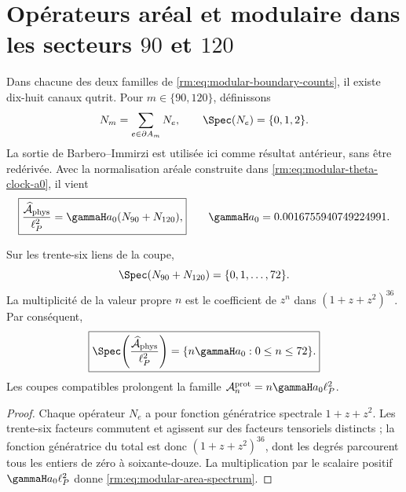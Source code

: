 \section{Opérateurs aréal et modulaire dans les secteurs \texorpdfstring{\(90\)}{90} et \texorpdfstring{\(120\)}{120}}

Dans chacune des deux familles de \cref{rm:eq:modular-boundary-counts}, il existe dix-huit canaux qutrit. Pour \(m\in\{90,120\}\), définissons
\begin{equation}
\label{rm:eq:modular-number-operators}
N_m=\sum_{e\in\partial A_m}N_e,
\qquad \Spec(N_e)=\{0,1,2\}.
\end{equation}
La sortie de Barbero--Immirzi est utilisée ici comme résultat antérieur, sans être redérivée. Avec la normalisation aréale construite dans \cref{rm:eq:modular-theta-clock-a0}, il vient
\begin{equation}
\label{rm:eq:modular-area-operator}
\boxed{
\frac{\widehat{\mathcal A}_{\rm phys}}{\ell_P^2}
=\gammaH a_0(N_{90}+N_{120}),}
\qquad
\gammaH a_0=0.0016755940749224991.
\end{equation}

\begin{theorem}
\label{rm:thm:modular-area-spectrum}
Sur les trente-six liens de la coupe,
\begin{equation}
\label{rm:eq:modular-total-number-spectrum}
\Spec(N_{90}+N_{120})=\{0,1,\ldots,72\}.
\end{equation}
La multiplicité de la valeur propre \(n\) est le coefficient de \(z^n\) dans \((1+z+z^2)^{36}\). Par conséquent,
\begin{equation}
\label{rm:eq:modular-area-spectrum}
\boxed{
\Spec\!\left(\frac{\widehat{\mathcal A}_{\rm phys}}{\ell_P^2}\right)
=\{n\gammaH a_0:0\leq n\leq72\}.}
\end{equation}
Les coupes compatibles prolongent la famille \(\mathcal A_n^{\rm prot}=n\gammaH a_0\ell_P^2\).
\end{theorem}

\begin{proof}
Chaque opérateur \(N_e\) a pour fonction génératrice spectrale \(1+z+z^2\). Les trente-six facteurs commutent et agissent sur des facteurs tensoriels distincts ; la fonction génératrice du total est donc \((1+z+z^2)^{36}\), dont les degrés parcourent tous les entiers de zéro à soixante-douze. La multiplication par le scalaire positif \(\gammaH a_0\ell_P^2\) donne \cref{rm:eq:modular-area-spectrum}.
\end{proof}

